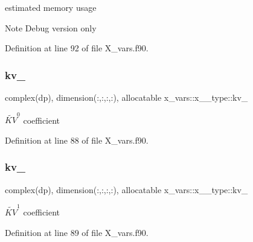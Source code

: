 estimated memory usage 

\begin{DoxyNote}{Note}
Debug version only 
\end{DoxyNote}


Definition at line 92 of file X\+\_\+vars.\+f90.

\mbox{\label{structx__vars_1_1x__2__type_ae7427dad704bb989266d32d97e5d0235}} 
\subsubsection{\texorpdfstring{kv\+\_}{kv\_0}}
{\footnotesize\ttfamily complex(dp), dimension(\+:,\+:,\+:,\+:), allocatable x\+\_\+vars\+::x\+\_\+\_\+type\+::kv\+\_}



$\widetilde{KV}^0$ coefficient 



Definition at line 88 of file X\+\_\+vars.\+f90.

\mbox{\label{structx__vars_1_1x__2__type_a0cad62f1816e668211135c7097916123}} 
\subsubsection{\texorpdfstring{kv\+\_}{kv\_1}}
{\footnotesize\ttfamily complex(dp), dimension(\+:,\+:,\+:,\+:), allocatable x\+\_\+vars\+::x\+\_\+\_\+type\+::kv\+\_}



$\widetilde{KV}^1$ coefficient 



Definition at line 89 of file X\+\_\+vars.\+f90.

\mbox{\label{structx__vars_1_1x__2__type_a7861681a8170e07ce68ae6d29af2f3d3}} 
